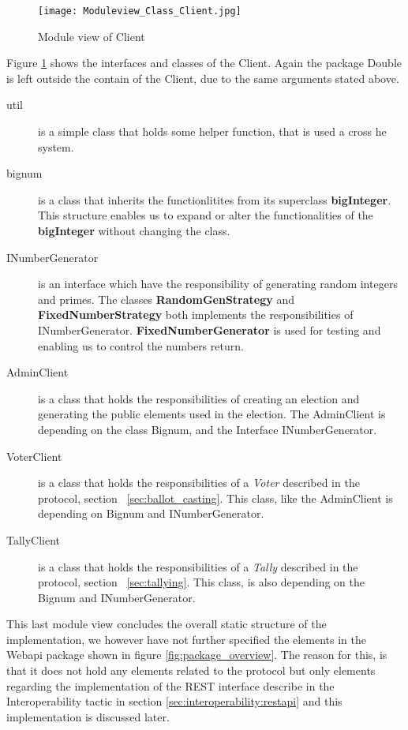 \begin{figure}[H]
    \centering
    \texttt{[image: Moduleview\_Class\_Client.jpg]}
    \caption{Module view of Client}
    \label{fig:module_view_of_client}
\end{figure}

\noindent
Figure \ref{fig:module_view_of_client} shows the interfaces and classes of the Client. Again the package Double is left outside the contain of the Client, due to the same arguments stated above. 

\begin{description}
    \item[util] is a simple class that holds some helper function, that is used a cross he system. 
    
    \item[bignum] is a class that inherits the functionlitites from its superclass \textbf{bigInteger}. This structure enables us to expand or alter the functionalities of the \textbf{bigInteger} without changing the class. 
    
    \item[INumberGenerator] is an interface which have the responsibility of generating random integers and primes. The classes \textbf{RandomGenStrategy} and \textbf{FixedNumberStrategy} both implements the responsibilities of INumberGenerator. \textbf{FixedNumberGenerator} is used for testing and enabling us to control the numbers return. 

    \item[AdminClient] is a class that holds the responsibilities of creating an election and generating the public elements used in the election. The AdminClient is depending on the class Bignum, and the Interface INumberGenerator. 
    
    \item[VoterClient] is a class that holds the responsibilities of a \textit{Voter} described in the protocol, section ~\ref{sec:ballot_casting}. This class, like the AdminClient is depending on Bignum and INumberGenerator.    
    
    \item[TallyClient] is a class that holds the responsibilities of a \textit{Tally} described in the protocol, section ~\ref{sec:tallying}. This class, is also depending on the Bignum and INumberGenerator. 
\end{description}

\noindent
This last module view concludes the overall static structure of the implementation, we however have not further specified the elements in the Webapi package shown in figure \ref{fig:package_overview}. The reason for this, is that it does not hold any elements related to the protocol but only elements regarding the implementation of the REST interface describe in the Interoperability tactic in section \ref{sec:interoperability:restapi} and this implementation is discussed later. \\

